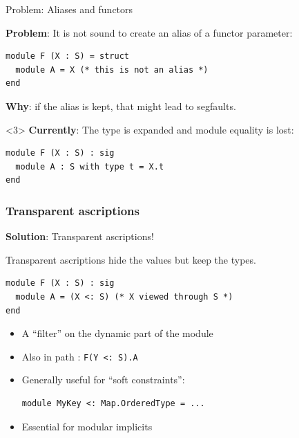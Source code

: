 \documentclass[aspectratio=169,dvipsnames,svgnames,10pt]{beamer}
\begin{document}
\begin{frame}[fragile]{Problem: Aliases and functors}
  
  {\bf Problem}: It is not sound to create an alias of a functor parameter:
\begin{verbatim}
module F (X : S) = struct
  module A = X (* this is not an alias *)
end
\end{verbatim}
  {\bf Why}: if the alias is kept, that might lead to segfaults.

    \begin{onlyenv}<3>
  {\bf Currently}: The type is expanded and module equality is lost:
\begin{verbatim}
module F (X : S) : sig
  module A : S with type t = X.t
end
\end{verbatim}
\end{onlyenv}
  
\end{frame}

\begin{frame}[fragile]
  \frametitle{Transparent ascriptions}

  {\bf Solution}: Transparent ascriptions!

  Transparent ascriptions hide the values but keep the types.
\begin{verbatim}
module F (X : S) : sig
  module A = (X <: S) (* X viewed through S *)
end
\end{verbatim}

  \pause
  \begin{itemize}
  \item A ``filter'' on the dynamic part of the module
  \item Also in path : \texttt{F(Y <:\ S).A}
  \item Generally useful for ``soft constraints'':
\begin{verbatim}
module MyKey <: Map.OrderedType = ...
\end{verbatim}
  \item Essential for modular implicits
  \end{itemize}
  
\end{frame}
\end{document}
